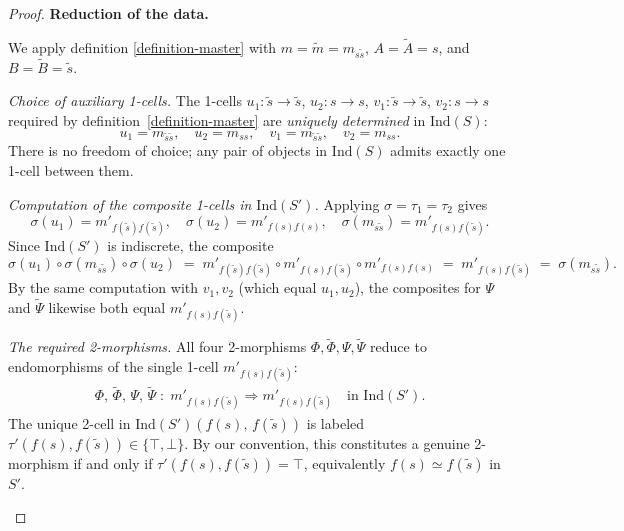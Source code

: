 \documentclass[10pt,a4paper]{amsart}
\begin{document}
\begin{proof}

  \medskip
  \noindent\textbf{Reduction of the data.}

  \medskip
  We apply definition \ref{definition-master} with $m = \tilde{m} = m_{s\tilde{s}}$,
  $A = \tilde{A} = s$, and $B = \tilde{B} = \tilde{s}$.

  \smallskip
  \noindent\emph{Choice of auxiliary 1-cells.}
  The 1-cells $u_1 : \tilde{s} \to \tilde{s}$, $u_2 : s \to s$,
  $v_1 : \tilde{s} \to \tilde{s}$, $v_2 : s \to s$ required by
  definition~\ref{definition-master} are \emph{uniquely determined} in $\mathrm{Ind}(S)$:
  \[
    u_1 = m_{\tilde{s}\tilde{s}}, \quad
    u_2 = m_{ss}, \quad
    v_1 = m_{\tilde{s}\tilde{s}}, \quad
    v_2 = m_{ss}.
  \]
  There is no freedom of choice; any pair of objects in $\mathrm{Ind}(S)$ admits
  exactly one 1-cell between them.

  \smallskip
  \noindent\emph{Computation of the composite 1-cells in $\mathrm{Ind}(S')$.}
  Applying $\sigma = \tau_1 = \tau_2$ gives
  \[
    \sigma(u_1) = m'_{f(\tilde{s})f(\tilde{s})}, \quad
    \sigma(u_2) = m'_{f(s)f(s)}, \quad
    \sigma(m_{s\tilde{s}}) = m'_{f(s)f(\tilde{s})}.
  \]
  Since $\mathrm{Ind}(S')$ is indiscrete, the composite
  \[
    \sigma(u_1) \circ \sigma(m_{s\tilde{s}}) \circ \sigma(u_2)
    \;=\; m'_{f(\tilde{s})f(\tilde{s})} \circ
    m'_{f(s)f(\tilde{s})} \circ
    m'_{f(s)f(s)}
    \;=\; m'_{f(s)f(\tilde{s})}
    \;=\; \sigma(m_{s\tilde{s}}).
  \]
  By the same computation with $v_1, v_2$ (which equal $u_1, u_2$), the
  composites for $\Psi$ and $\widetilde{\Psi}$ likewise both equal
  $m'_{f(s)f(\tilde{s})}$.

  \smallskip
  \noindent\emph{The required 2-morphisms.}
  All four 2-morphisms $\Phi, \widetilde{\Phi}, \Psi, \widetilde{\Psi}$
  reduce to endomorphisms of the single 1-cell
  $m'_{f(s)f(\tilde{s})}$:
  \begin{align}
    \Phi,\,\widetilde{\Phi},\,\Psi,\,\widetilde{\Psi}
    \;:\;
    m'_{f(s)f(\tilde{s})} \Rightarrow m'_{f(s)f(\tilde{s})}
    \quad \text{in } \mathrm{Ind}(S').
    \label{eq:2cells}
  \end{align}
  The unique 2-cell in $\mathrm{Ind}(S')(f(s),\,f(\tilde{s}))$ is labeled
  $\tau'(f(s), f(\tilde{s})) \in \{\top, \bot\}$. By our convention, this
  constitutes a genuine 2-morphism if and only if
  $\tau'(f(s), f(\tilde{s})) = \top$, equivalently $f(s) \simeq f(\tilde{s})$
  in $S'$.

  \begin{itemize}
  

\end{itemize}
\end{proof}
\end{document}
